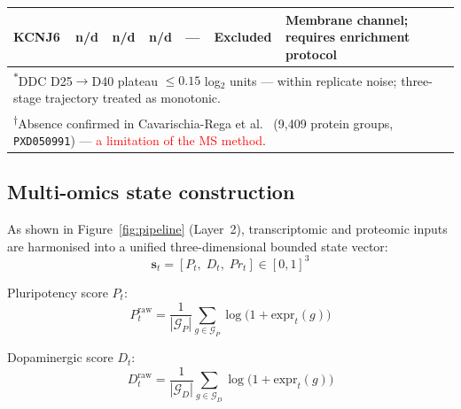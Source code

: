 \documentclass[5p,times,twocolumn]{elsarticle}
\newcommand{\lang}[1]{\textcolor{red}{#1}}
\begin{document}
\begin{table}[!htbp]
{\begin{tabular}{lcccccl}
      KCNJ6
      & n/d  & n/d   & n/d
      & ---
      & Excluded
      & Membrane channel; requires enrichment protocol \\
      \bottomrule
      \multicolumn{7}{l}{%
        \textsuperscript{$*$}DDC D25$\to$D40 plateau
        $\leq 0.15$ log$_{2}$ units --- within replicate noise;
        three-stage trajectory treated as monotonic.} \\
      \multicolumn{7}{l}{%
        \textsuperscript{$\dagger$}Absence confirmed in
        Cavarischia-Rega et al.~\cite{cavarischia2024proteome}
        (9,409 protein groups, \texttt{PXD050991}) ---
        \lang{a limitation of the MS method}.}
    \end{tabular}}
\end{table}

\subsection{\textbf{Multi-omics state construction}}
\label{sec:state}

As shown in Figure~\ref{fig:pipeline} (Layer~2),
transcriptomic and proteomic inputs are harmonised into
a unified three-dimensional bounded state vector:
%
\begin{equation}
  \mathbf{s}_{t} = [P_{t},\; D_{t},\; Pr_{t}] \in [0,1]^{3}
  \label{eq:state}
\end{equation}

Pluripotency score $P_{t}$:
%
\begin{equation}
  P_{t}^{\text{raw}} =
    \frac{1}{|\mathcal{G}_{P}|}
    \sum_{g \in \mathcal{G}_{P}} \log\!\bigl(1 + \text{expr}_{t}(g)\bigr)
  \label{eq:P}
\end{equation}

Dopaminergic score $D_{t}$:
%
\begin{equation}
  D_{t}^{\text{raw}} =
    \frac{1}{|\mathcal{G}_{D}|}
    \sum_{g \in \mathcal{G}_{D}} \log\!\bigl(1 + \text{expr}_{t}(g)\bigr)
  \label{eq:D}
\end{equation}
\end{document}
